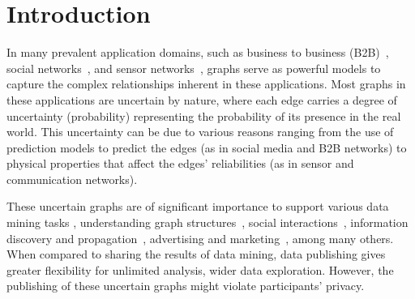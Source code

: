 \section{Introduction}
\label{sec:Intro}

In many prevalent application domains, such as business to business (B2B)~\cite{Lin_B2B}, social networks~\cite{Adar_Managing_2007,Kempe_Maximizing_2003}, and sensor networks~\cite{ZhangSensorNetwork}, graphs serve as powerful models to capture the complex relationships inherent in these applications. 
Most graphs in these applications are uncertain by nature, where each edge carries a degree of uncertainty (probability) representing the probability of its presence in the real world. This uncertainty can be due to various reasons ranging from the use of prediction models to predict the edges (as in social media and B2B networks)  to physical properties that affect the edges' reliabilities (as in sensor and communication networks).  

These uncertain graphs are of significant importance to support various data mining tasks {\eg}, 
understanding  graph structures~\cite{Bollacker_Freebase_2008,Krogan_Global_2006}, social interactions~\cite{Cho_Friendship_2011}, 
information discovery and propagation~\cite{Zhao_Detecting_2014}, advertising and marketing~\cite{Kempe_Maximizing_2003}, among many others.
When compared to sharing the results of data mining, data publishing gives greater flexibility for unlimited analysis,  wider data exploration. However, the publishing of these uncertain graphs might violate participants' privacy.   


